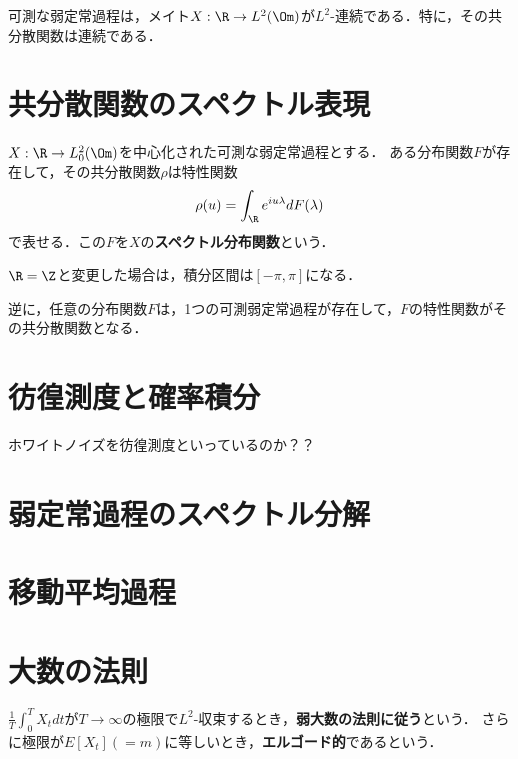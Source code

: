 \documentclass[uplatex,dvipdfmx]{jsreport}
\begin{document}
\begin{theorem}[Crum]
    可測な弱定常過程は，メイト$X:\R\to L^2(\Om)$が$L^2$-連続である．特に，その共分散関数は連続である．
\end{theorem}

\section{共分散関数のスペクトル表現}

\begin{theorem}
    $X:\R\to L^2_0(\Om)$を中心化された可測な弱定常過程とする．
    ある分布関数$F$が存在して，その共分散関数$\rho$は特性関数
    \[\rho(u)=\int_\R e^{iu\lambda}dF(\lambda)\]
    で表せる．この$F$を$X$の\textbf{スペクトル分布関数}という．
\end{theorem}
\begin{remark}
    $\R=\Z$と変更した場合は，積分区間は$[-\pi,\pi]$になる．
\end{remark}

\begin{theorem}
    逆に，任意の分布関数$F$は，1つの可測弱定常過程が存在して，$F$の特性関数がその共分散関数となる．
\end{theorem}

\section{彷徨測度と確率積分}

\begin{tcolorbox}[colframe=ForestGreen, colback=ForestGreen!10!white,breakable,colbacktitle=ForestGreen!40!white,coltitle=black,fonttitle=\bfseries\sffamily,
title=]
    ホワイトノイズを彷徨測度といっているのか？？
\end{tcolorbox}

\section{弱定常過程のスペクトル分解}

\section{移動平均過程}

\section{大数の法則}

\begin{definition}
    $\frac{1}{T}\int^T_0X_tdt$が$T\to\infty$の極限で$L^2$-収束するとき，\textbf{弱大数の法則に従う}という．
    さらに極限が$E[X_t](=m)$に等しいとき，\textbf{エルゴード的}であるという．
\end{definition}
\end{document}
